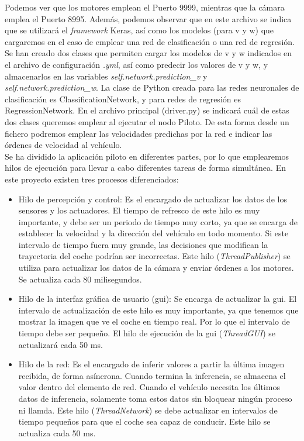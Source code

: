 Podemos ver que los motores emplean el Puerto 9999, mientras que la cámara emplea el Puerto 8995. Además, podemos observar que en este archivo se indica que se utilizará el \textit{framework} Keras, así como los modelos (para v y w) que cargaremos en el caso de emplear una red de clasificación o una red de regresión.\\

Se han creado dos clases que permiten cargar los modelos de v y w indicados en el archivo de configuración \textit{.yml}, así como predecir los valores de v y w, y almacenarlos en las variables \textit{self.network.prediction\_v} y \textit{self.network.prediction\_w}. La clase de Python creada para las redes neuronales de clasificación es ClassificationNetwork, y para redes de regresión es RegressionNetwork. En el archivo principal (driver.py) se indicará cuál de estas dos clases queremos emplear al ejecutar el nodo Piloto. De esta forma desde un fichero podremos emplear las velocidades predichas por la red e indicar las órdenes de velocidad al vehículo.\\

Se ha dividido la aplicación piloto en diferentes partes, por lo que emplearemos hilos de ejecución para llevar a cabo diferentes tareas de forma simultánea. En este proyecto existen tres procesos diferenciados:

\begin{itemize}
    \item Hilo de percepción y control: Es el encargado de actualizar los datos de los sensores y los actuadores. El tiempo de refresco de este hilo es muy importante, y debe ser un periodo de tiempo muy corto, ya que se encarga de establecer la velocidad y la dirección del vehículo en todo momento. Si este intervalo de tiempo fuera muy grande, las decisiones que modifican la trayectoria del coche podrían ser incorrectas. Este hilo (\textit{ThreadPublisher}) se utiliza para actualizar los datos de la cámara y enviar órdenes a los motores. Se actualiza cada 80 milisegundos.
    
    \item Hilo de la interfaz gráfica de usuario (\acrshort{gui}): Se encarga de actualizar la \acrshort{gui}. El intervalo de actualización de este hilo es muy importante, ya que tenemos que mostrar la imagen que ve el coche en tiempo real. Por lo que el intervalo de tiempo debe ser pequeño. El hilo de ejecución de la \acrshort{gui} (\textit{ThreadGUI}) se actualizará cada 50 ms.
    
    \item Hilo de la red: Es el encargado de inferir valores a partir la última imagen recibida, de forma asíncrona. Cuando termina la inferencia, se almacena el valor dentro del elemento de red. Cuando el vehículo necesita los últimos datos de inferencia, solamente toma estos datos sin bloquear ningún proceso ni llamda. Este hilo (\textit{ThreadNetwork}) se debe actualizar en intervalos de tiempo pequeños para que el coche sea capaz de conducir. Este hilo se actualiza cada 50 ms.

\end{itemize}

